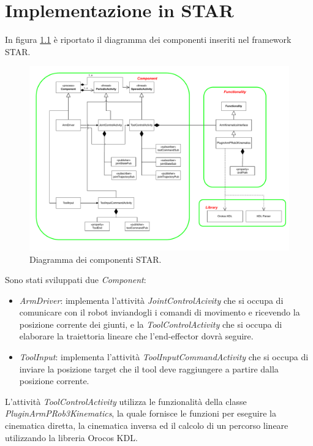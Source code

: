 \chapter{Implementazione in STAR}
In figura \ref{fig:star_diagram} è riportato il diagramma dei componenti inseriti nel framework STAR. 
\begin{figure}[tbh]
	\centering
	\includegraphics[width=1\linewidth]{./ImageFiles/publish_subscribe_architecture.drawio.pdf}
	\caption{Diagramma dei componenti STAR.}
	\label{fig:star_diagram}
\end{figure}

\noindent
Sono stati sviluppati due \textit{Component}:
\begin{itemize}
	\item \textit{ArmDriver}: implementa l'attività \textit{JointControlAcivity} che si occupa di comunicare con il robot inviandogli i comandi di movimento e ricevendo la posizione corrente dei giunti, e la \textit{ToolControlActivity} che si occupa di elaborare la traiettoria lineare che l'end-effector dovrà seguire. 
	\item \textit{ToolInput}: implementa l'attività \textit{ToolInputCommandActivity} che si occupa di inviare la posizione target che il tool deve raggiungere a partire dalla posizione corrente.
\end{itemize}
\noindent
L'attività \textit{ToolControlActivity} utilizza le funzionalità della classe \textit{PluginArmPRob3Kinematics}, la quale fornisce le funzioni per eseguire la cinematica diretta, la cinematica inversa ed il calcolo di un percorso lineare utilizzando la libreria Orocos KDL.

